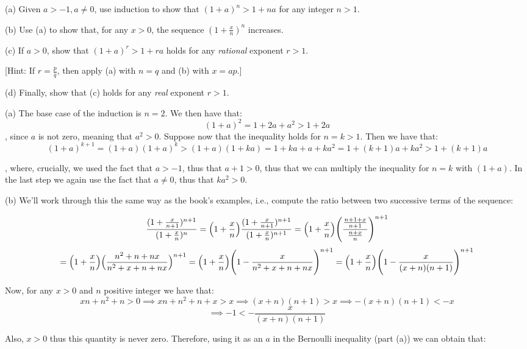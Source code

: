 \begin{exercise}{18}
    (a) Given $a > -1, a \neq 0$, use induction to show that $(1+a)^n > 1 +na$ for any integer $n > 1$.
    
    (b) Use (a) to show that, for any $x > 0$, the sequence $(1 + \frac{x}{n})^n$ increases.

    (c) If $a > 0$, show that $(1+a)^r > 1 + ra$ holds for any \textit{rational} exponent $r > 1$.

    [Hint: If $r = \frac{p}{q}$, then apply (a) with $n = q$ and (b) with $x = ap$.]

    (d) Finally, show that (c) holds for any \textit{real} exponent $r > 1$.
\end{exercise}

\begin{solution}
    
    (a) The base case of the induction is $n = 2$. We then have that:
    $$(1 +a)^2 = 1 + 2a + a^2 > 1 + 2a$$
    , since $a$ is not zero, meaning that $a^2 > 0$. Suppose now that the inequality holds for $n = k > 1$. Then we have that:
    $$(1 +a)^{k+1} = (1+a)(1+a)^k > (1+a)(1 +ka) = 1 + ka + a + ka^2 = 1 + (k+1)a +ka^2 > 1 + (k+1)a$$

    , where, crucially, we used the fact that $a > -1$, thus that $a + 1 > 0$, thus that we can multiply the inequality for $n = k$ with $(1+a)$. In the last step we again use the fact that $a \neq 0$, thus that $ka^2 > 0$.

    (b) We'll work through this the same way as the book's examples, i.e., compute the ratio between two successive terms of the sequence:
    
    $$\frac{(1+\frac{x}{n+1})^{n+1}}{(1+\frac{x}{n})^n} = \Bigl(1+\frac{x}{n}\Bigr)\frac{(1+\frac{x}{n+1})^{n+1}}{(1+\frac{x}{n})^{n+1}} = \Bigl(1+\frac{x}{n}\Bigr)\Biggl(\frac{\frac{n+1+x}{n+1}}{\frac{n+x}{n}}\Biggr)^{n+1}$$
    $$= \Bigl(1+\frac{x}{n}\Bigr)\Bigl(\frac{n^2+n+nx}{n^2+x+n+nx}\Bigr)^{n+1} = \Bigl(1+\frac{x}{n}\Bigr)\Biggl(1 - \frac{x}{n^2+x+n+nx}\Biggr)^{n+1} = \Bigl(1+\frac{x}{n}\Bigr) \Biggl(1 - \frac{x}{(x+n)(n+1)}\Biggr)^{n+1}$$

    Now, for any $x > 0$ and $n$ positive integer we have that:
    $$xn +n^2+n > 0 \implies xn + n^2 + n + x > x \implies (x+n)(n+1) > x \implies - (x+n)(n+1) < -x$$
    $$\implies -1 < -\frac{x}{(x+n)(n+1)}$$

    Also, $x > 0$ thus this quantity is never zero. Therefore, using it as an $a$ in the Bernoulli inequality (part (a)) we can obtain that:


\end{solution}

